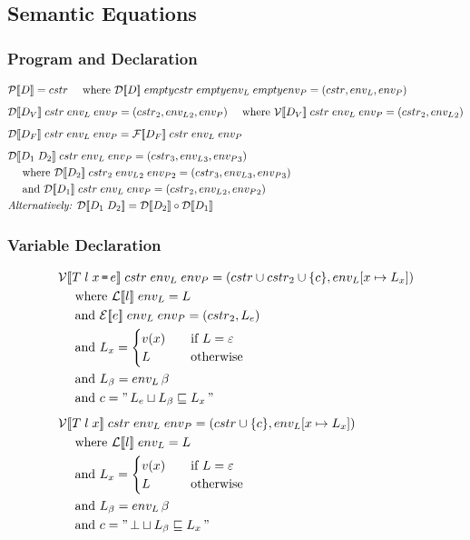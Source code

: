 \subsection{Semantic Equations}

\subsubsection{Program and Declaration}
\begin{align*}
& \iP\dblSq{D} = \icstr \dsWhere{\iD\dblSq{D} \; empty\icstr \; empty\ienvL \; empty\ienvP = (\icstr, \ienvL, \ienvP)} \rspace
& \iD\dblSq{D_V} \; \icstr \; \ienvL \; \ienvP = (\icstr_2, \ienvL_2, \ienvP) \dsWhere{\iV\dblSq{D_V} \; \icstr \; \ienvL \; \ienvP = (\icstr_2, \ienvL_2)} \rspace
& \iD\dblSq{D_F} \; \icstr \; \ienvL \; \ienvP = \iF\dblSq{D_F} \; \icstr \; \ienvL \; \ienvP \rspace
& \iD\dblSq{D_1 \; D_2} \; \icstr \; \ienvL \; \ienvP = (\icstr_3, \ienvL_3, \ienvP_3) \\
& \quad \text{ where } \iD\dblSq{D_2} \; \icstr_2 \; \ienvL_2 \; \ienvP_2  = (\icstr_3, \ienvL_3, \ienvP_3) \\
& \quad \text{ and } \iD\dblSq{D_1} \; \icstr \; \ienvL \; \ienvP = (\icstr_2, \ienvL_2, \ienvP_2) \\
& \textit{Alternatively: } \iD\dblSq{D_1 \; D_2} = \iD\dblSq{D_2} \circ \iD\dblSq{D_1}
\end{align*}

\subsubsection{Variable Declaration}
\begin{align*}
& \iV\dblSq{T \; l \; x \tk = e} \; \icstr \; \ienvL \; \ienvP = (\icstr \cup \icstr_2 \cup \{ c \}, \ienvL[x \mapsto L_x]) \\
& \dsWhere{\iL\dblSq{l} \; \ienvL = L} \\
& \dsAnd{\iE\dblSq{e} \; \ienvL \; \ienvP = (\icstr_2, L_e)} \\
& \dsAnd{L_x = \begin{cases}
    v(x) & \quad \text{if } L = \varepsilon \\
    L & \quad \text{otherwise}
  \end{cases}} \\
& \dsAnd{L_\ib = \ienvL \, \ib} \\
& \dsAnd{c = " \, L_e \sqcup L_\ib \sqsubseteq L_x \, "} \rspace
& \iV\dblSq{T \; l \; x} \; \icstr \; \ienvL \; \ienvP = (cstr \cup \{ c \}, \ienvL[x \mapsto L_x])\\
& \dsWhere{\iL\dblSq{l} \; \ienvL = L} \\
& \dsAnd{L_x = \begin{cases}
    v(x) & \quad \text{if } L = \varepsilon \\
    L & \quad \text{otherwise}
  \end{cases}} \\
& \dsAnd{L_\ib = \ienvL \, \ib} \\
& \dsAnd{c = " \, \bot \sqcup L_\ib \sqsubseteq L_x \, "}
\end{align*}
